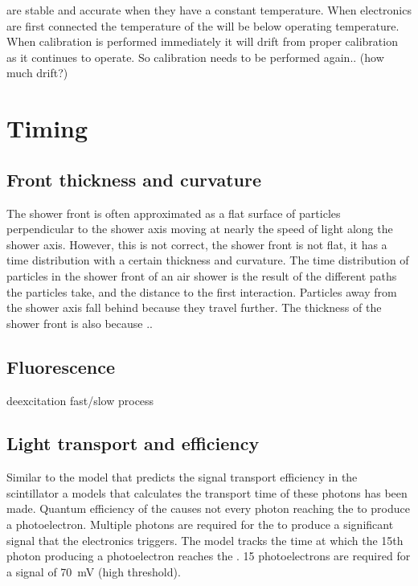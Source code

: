 \adcs are stable and accurate when they have a constant temperature. When \hisparc electronics are first connected the temperature of the \adcs will be below operating temperature. When calibration is performed immediately it will drift from proper calibration as it continues to operate. So calibration needs to be performed again.. (how much drift?)


\section{Timing}


\subsection{Front thickness and curvature}

The shower front is often approximated as a flat surface  of particles
perpendicular to the shower axis moving at nearly the speed of light
along the shower axis. However, this is not correct, the shower front is
not flat, it has a time distribution with a certain thickness and
curvature. The time distribution of particles in the shower front of an
air shower is the result of the different paths the particles take, and
the distance to the first interaction. Particles away from the shower
axis fall behind because they travel further. The thickness of the
shower front is also because ..


\subsection{Fluorescence}

deexcitation fast/slow process



\subsection{Light transport and \pmt efficiency}

Similar to the model that predicts the signal transport efficiency in
the scintillator a models that calculates the transport time of these
photons has been made. Quantum efficiency of the \pmt causes not every
photon reaching the \pmt to produce a photoelectron. Multiple photons
are required for the \pmt to produce a significant signal that the
\hisparc electronics triggers. The model tracks the time at which the
15th photon producing a photoelectron reaches the \pmt. 15
photoelectrons are required for a signal of \SI{70}{\milli\volt} (high
threshold).

